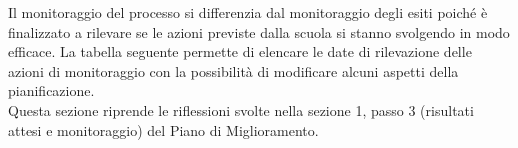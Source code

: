 \documentclass[12pt,a4paper,oneside]{memoir}
\begin{document}
\begin{center}
\end{center} 


Il monitoraggio del processo si differenzia dal monitoraggio degli esiti poiché è finalizzato a rilevare se le azioni previste dalla scuola si stanno svolgendo in modo efficace. La tabella seguente permette di elencare le date di rilevazione delle azioni di monitoraggio con la possibilità di modificare alcuni aspetti della pianificazione.\\
Questa sezione riprende le riflessioni svolte nella sezione 1, passo 3 (risultati attesi e monitoraggio) del Piano di Miglioramento.\\
\end{document}

